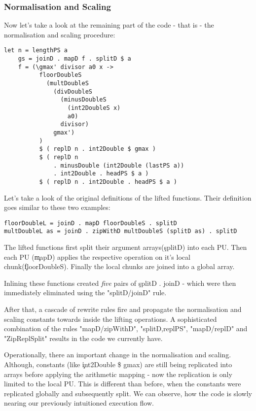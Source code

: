       \subsubsection{Normalisation and Scaling}
      
      Now let's take a look at the remaining part of the code - that is - the
      normalisation and scaling procedure:
      
      \begin{lstlisting}
let n = lengthPS a
    gs = joinD . mapD f . splitD $ a
    f = (\gmax' divisor a0 x ->
          floorDoubleS
            (multDoubleS
              (divDoubleS
                (minusDoubleS
                  (int2DoubleS x)
                  a0)
                divisor)
              gmax')
          )
          $ ( replD n . int2Double $ gmax )
          $ ( replD n
              . minusDouble (int2Double (lastPS a))
              . int2Double . headPS $ a )
          $ ( replD n . int2Double . headPS $ a )
      \end{lstlisting}
      Let's take a look of the original definitions of the lifted functions. Their definition goes similar to these two examples:
      \begin{lstlisting}
floorDoubleL = joinD . mapD floorDoubleS . splitD
multDoubleL as = joinD . zipWithD multDoubleS (splitD as) . splitD
      \end{lstlisting}
      The lifted functions first split their argument arrays(\c{splitD}) into each PU.
      Then each PU (\c{mapD}) applies the respective operation on it's local chunk(\c{floorDoubleS}).
      Finally the local chunks are joined into a global array.
      
      Inlining these functions created \emph{five} pairs of \c{splitD . joinD} - which were then immediately
      eliminated using the "splitD/joinD" rule.
      
      After that, a cascade of rewrite rules fire and propagate the normalisation and scaling
      constants towards inside the lifting operations. A sophisticated combination of the rules
      "mapD/zipWithD", "splitD,replPS", "mapD/replD" and "ZipReplSplit" results in
      the code we currently have.
      
      Operationally, there an important change in the normalisation and scaling.
      Although, constants (like \c{int2Double \$ gmax}) are still being replicated into arrays
      before applying the arithmetic mapping - now the replication
      is only limited to the local PU. This is different than before, when
      the constants were replicated globally and subsequently split.
      We can observe, how the code is slowly nearing our previously intuitioned execution flow.
      
